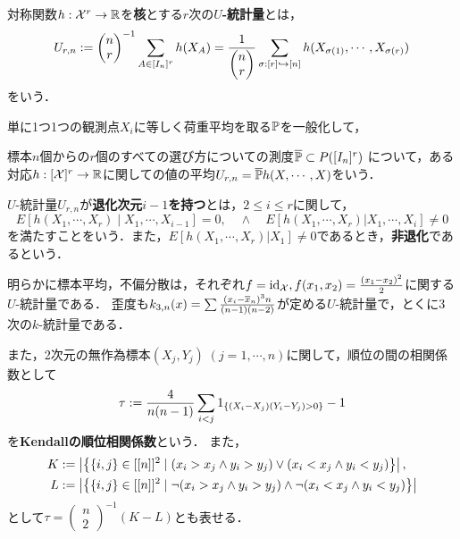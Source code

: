 \documentclass[uplatex,dvipdfmx]{jsreport}
\begin{document}
\begin{definition}
    対称関数$h:\mathcal{X}^r\to\mathbb{R}$を\textbf{核}とする$r$次の\textbf{$U$-統計量}とは，
    \[U_{r,n}:=\begin{pmatrix}n\\r\end{pmatrix}^{-1}\sum_{A\in[I_n]^r}h(X_A)=\frac{1}{\begin{pmatrix}n\\r\end{pmatrix}}\sum_{\sigma:[r]\hookrightarrow[n]}h(X_{\sigma(1)},\cdots,X_{\sigma(r)})\]
    をいう．
\end{definition}
\begin{remarks}[標本平均の拡張]
    単に1つ1つの観測点$X_i$に等しく荷重平均を取る$\mathbb{P}$を一般化して，

    標本$n$個からの$r$個のすべての選び方についての測度$\overline{\mathbb{P}}\subset P([I_n]^r)$
    について，ある対応$h:[\mathcal{X}]^r\to\mathbb{R}$に関しての値の平均$U_{r,n}=\overline{\mathbb{P}}h(X,\cdots,X)$をいう．
\end{remarks}

\begin{definition}
    $U$-統計量$U_{r,n}$が\textbf{退化次元$i-1$を持つ}とは，$2\le i\le r$に関して，
    \[E[h(X_1,\cdots,X_r)\mid X_1,\cdots,X_{i-1}]=0,\quad\land\quad E[h(X_1,\cdots,X_r)|X_1,\cdots,X_i]\ne0\]
    を満たすことをいう．また，$E[h(X_1,\cdots,X_r)|X_1]\ne0$であるとき，\textbf{非退化}であるという．
\end{definition}

\begin{example}
    明らかに標本平均，不偏分散は，それぞれ$f=\mathrm{id}_{\mathcal{X}},f(x_1,x_2)=\frac{(x_1-x_2)^2}{2}$に関する$U$-統計量である．
    歪度も$k_{3,n}(x)=\sum\frac{(x_i-\overline{x}_n)^3n}{(n-1)(n-2)}$が定める$U$-統計量で，とくに3次の$k$-統計量である．

    また，2次元の無作為標本$(X_j,Y_j)\;(j=1,\cdots,n)$に関して，順位の間の相関係数として
    \[\tau:=\frac{4}{n(n-1)}\sum_{i<j}1_{\left\{(X_i-X_j)(Y_i-Y_j)>0\right\}}-1\]
    を\textbf{Kendallの順位相関係数}という．
    また，
    \begin{align*}
        K&:=\left|\left\{\{i,j\}\in[[n]]^2\mid (x_i>x_j\land y_i>y_j)\lor(x_i<x_j\land y_i<y_j)\right\}\right|,\\L&:=\left|\left\{\{i,j\}\in[[n]]^2\mid\lnot(x_i>x_j\land y_i>y_j)\land\lnot(x_i<x_j\land y_i<y_j)\right\}\right|
    \end{align*}
    として$\tau=\begin{pmatrix}n\\2\end{pmatrix}^{-1}(K-L)$とも表せる．
\end{example}
\end{document}
